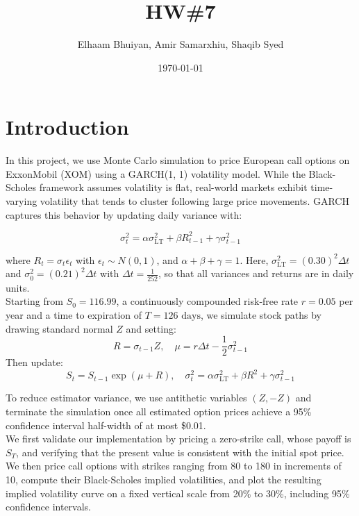 \documentclass{report}
\title{HW\#7}
\author{
Elhaam Bhuiyan,
Amir Samarxhiu,
Shaqib Syed
}
\date{\today}
\begin{document}
\maketitle

\section*{Introduction}

In this project, we use Monte Carlo simulation to price European call options on ExxonMobil (XOM) using a GARCH(1, 1) volatility model. While the Black-Scholes framework assumes volatility is flat, real-world markets exhibit time-varying volatility that tends to cluster following large price movements. GARCH captures this behavior by updating daily variance with:

\[
\sigma_t^2 = \alpha \sigma_{\text{LT}}^2 + \beta R_{t-1}^2 + \gamma \sigma_{t-1}^2
\]

where $R_t = \sigma_t\epsilon_t$ with $\epsilon_t \sim N(0, 1)$, and $\alpha + \beta + \gamma = 1$. Here, $\sigma_{\text{LT}}^2 = (0.30)^2\Delta t$ and $\sigma_0^2 = (0.21)^2 \Delta t$ with $\Delta t = \frac{1}{252}$, so that all variances and returns are in daily units. \\

Starting from $S_0 = 116.99$, a continuously compounded risk-free rate $r = 0.05$ per year and a time to expiration of $T = 126 \text{ days}$, we simulate stock paths by drawing standard normal $Z$ and setting:
\[
R = \sigma_{t-1}Z,\quad \mu = r \Delta t - \frac{1}{2}\sigma_{t-1}^2
\]
Then update:
\[
S_t = S_{t-1}\exp(\mu + R),\quad \sigma_t^2 =\alpha \sigma_{\text{LT}}^2 + \beta R^2 + \gamma \sigma_{t-1}^2
\]

To reduce estimator variance, we use antithetic variables $(Z, -Z)$ and terminate the simulation once all estimated option prices achieve a 95\% confidence interval half-width of at most \$0.01. \\

We first validate our implementation by pricing a zero-strike call, whose payoff is $S_T$, and verifying that the present value is consistent with the initial spot price. We then price call options with strikes ranging from 80 to 180 in increments of 10, compute their Black-Scholes implied volatilities, and plot the resulting implied volatility curve on a fixed vertical scale from 20\% to 30\%, including 95\% confidence intervals. \\
\end{document}
